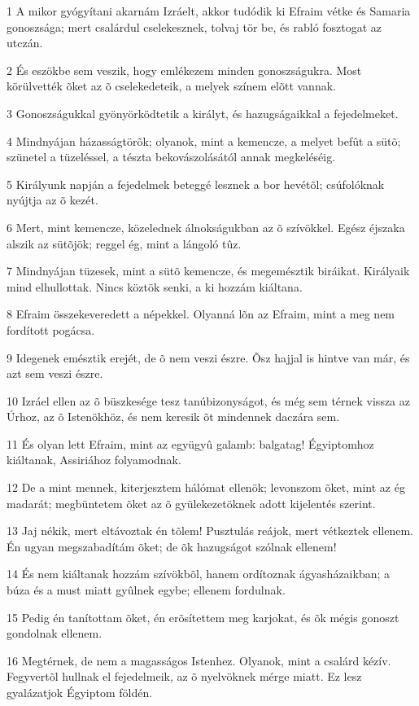 \par 1 A mikor gyógyítani akarnám Izráelt, akkor tudódik ki Efraim vétke és Samaria gonoszsága; mert csalárdul cselekesznek, tolvaj tör be, és rabló fosztogat az utczán.
\par 2 És eszökbe sem veszik, hogy emlékezem minden gonoszságukra. Most körülvették õket az õ cselekedeteik, a melyek színem elõtt vannak.
\par 3 Gonoszságukkal gyönyörködtetik a királyt, és hazugságaikkal a fejedelmeket.
\par 4 Mindnyájan házasságtörõk; olyanok, mint a kemencze, a melyet befût a sütõ; szünetel a tüzeléssel, a tészta bekovászolásától annak megkeléséig.
\par 5 Királyunk napján a fejedelmek beteggé lesznek a bor hevétõl; csúfolóknak nyújtja az õ kezét.
\par 6 Mert, mint kemencze, közelednek álnokságukban az õ szívökkel. Egész éjszaka alszik az sütõjök; reggel ég, mint a lángoló tûz.
\par 7 Mindnyájan tüzesek, mint a sütõ kemencze, és megemésztik biráikat. Királyaik mind elhullottak. Nincs köztök senki, a ki hozzám kiáltana.
\par 8 Efraim összekeveredett a népekkel. Olyanná lõn az Efraim, mint a meg nem fordított pogácsa.
\par 9 Idegenek emésztik erejét, de õ nem veszi észre. Õsz hajjal is hintve van már, és azt sem veszi észre.
\par 10 Izráel ellen az õ büszkesége tesz tanúbizonyságot, és még sem térnek vissza az Úrhoz, az õ Istenökhöz, és nem keresik õt mindennek daczára sem.
\par 11 És olyan lett Efraim, mint az együgyû galamb: balgatag! Égyiptomhoz kiáltanak, Assiriához folyamodnak.
\par 12 De a mint mennek, kiterjesztem hálómat ellenök; levonszom õket, mint az ég madarát; megbüntetem õket az õ gyülekezetöknek adott kijelentés szerint.
\par 13 Jaj nékik, mert eltávoztak én tõlem! Pusztulás reájok, mert vétkeztek ellenem. Én ugyan megszabadítám õket; de õk hazugságot szólnak ellenem!
\par 14 És nem kiáltanak hozzám szívökbõl, hanem ordítoznak ágyasházaikban; a búza és a must miatt gyûlnek egybe; ellenem fordulnak.
\par 15 Pedig én tanítottam õket, én erõsítettem meg karjokat, és õk mégis gonoszt gondolnak ellenem.
\par 16 Megtérnek, de nem a magasságos Istenhez. Olyanok, mint a csalárd kézív. Fegyvertõl hullnak el fejedelmeik, az õ nyelvöknek mérge miatt. Ez lesz gyalázatjok Égyiptom földén.


